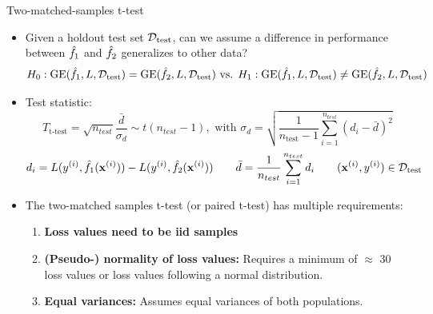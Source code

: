 \documentclass[11pt,compress,t,notes=noshow, xcolor=table]{beamer}
\begin{document}
\begin{frame}{Two-matched-samples t-test}



    \begin{itemize}
        \item Given a holdout test set $\mathcal{D}_{\text{test}}$, can we assume a difference in performance between $\hat{f}_1$ and $\hat{f}_2$ generalizes to other data?
        $$H_0: \mathrm{GE}(\hat{f}_1, L, \mathcal{D}_{\text{test}}) = \mathrm{GE}(\hat{f}_2, L, \mathcal{D}_{\text{test}}) \text{ vs. } H_1: \mathrm{GE}(\hat{f}_1, L, \mathcal{D}_{\text{test}}) \neq \mathrm{GE}(\hat{f}_2, L, \mathcal{D}_{\text{test}})$$
        \item Test statistic:
            $$
            T_{\text{t-test}} = \sqrt{n_{test}} \frac{\bar{d}}{\sigma_{d}} \sim t(n_{test} - 1), \text{ with }
            \sigma_{d} = \sqrt{\frac{1}{n_{\text{test}} - 1}\sum_{i=1}^{n_{test}} \left(d_i - \bar{d} \right)^2}
        $$
        $$d_i = L(y^{(i)}, \hat{f}_1 (\mathbf{x}^{(i)})) - L(y^{(i)}, \hat{f}_2 (\mathbf{x}^{(i)}))\qquad \bar{d} = \frac{1}{n_{test}} \sum\limits_{i=1}^{n_{test}} d_i \qquad (\mathbf{x}^{(i)}, y^{(i)}) \in \mathcal{D}_{\text{test}}$$
        \item The two-matched samples t-test (or paired t-test) has multiple requirements:
        \begin{enumerate}
            \item \textbf{Loss values need to be iid samples} %

            \item \textbf{(Pseudo-) normality of loss values:}
            Requires a minimum of $\approx$ 30 loss values or loss values following a normal distribution.
            \item \textbf{Equal variances:} Assumes equal variances of both populations. %
        \end{enumerate}
    \end{itemize}
\end{frame}

\end{document}
